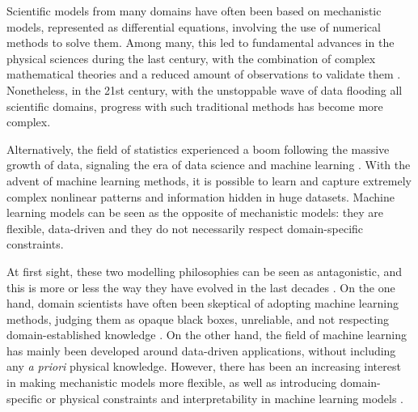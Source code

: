
Scientific models from many domains have often been based on mechanistic models, represented as differential equations, involving the use of numerical methods to solve them. 
Among many, this led to fundamental advances in the physical sciences during the last century, with the combination of complex mathematical theories and a reduced amount of observations to validate them
\cite{Wigner.1960, Rude:2018jv}. 
Nonetheless, in the 21st century, with the unstoppable wave of data flooding all scientific domains, progress with such traditional methods has become more complex. 

Alternatively, the field of statistics experienced a boom following the massive growth of data, signaling the era of data science and machine learning \cite{Cox:2017hv}.
With the advent of machine learning methods, it is possible to learn and capture extremely complex nonlinear patterns and information hidden in huge datasets. 
Machine learning models can be seen as the opposite of mechanistic models: they are flexible, data-driven and they do not necessarily respect domain-specific constraints.

At first sight, these two modelling philosophies can be seen as antagonistic, and this is more or less the way they have evolved in the last decades \cite{zdeborova_understanding_2020}. 
On the one hand, domain scientists have often been skeptical of adopting machine learning methods, judging them as opaque black boxes, unreliable, and not respecting domain-established knowledge \cite{Coveney:2016eb}.
On the other hand, the field of machine learning has mainly been developed around data-driven applications, without including any \textit{a priori} physical knowledge. 
However, there has been an increasing interest in making mechanistic models more flexible, as well as introducing domain-specific or physical constraints and interpretability in machine learning models \cite{Molnar.2020sisk,Rudin.2022}.

